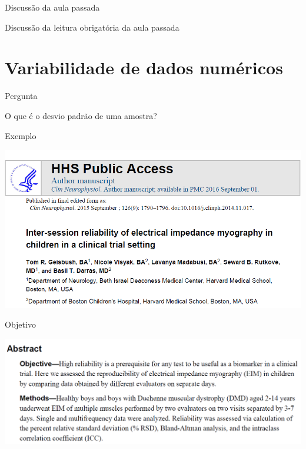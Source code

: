 \documentclass{beamer}
\begin{document}

\begin{frame}{\scriptsize Discussão da aula passada}
  \begin{block}{}
    \footnotesize
    Discussão da leitura obrigatória da aula passada
  \end{block}
\end{frame}

\section{Variabilidade de dados numéricos}

\begin{frame}[label=oquee]{\scriptsize Pergunta}
  \begin{block}{}
    \Large\centering
    O que é o desvio padrão de uma amostra?
  \end{block}
\end{frame}

\begin{frame}{\scriptsize Exemplo}
  \begin{center}
    \includegraphics[width=1.2\textwidth]{Cap3/DP1}
  \end{center}
\end{frame}


\begin{frame}{\scriptsize Objetivo}
  \begin{center}
    \includegraphics[width=1.2\textwidth]{Cap3/RSD0}
  \end{center}
\end{frame}
\end{document}

